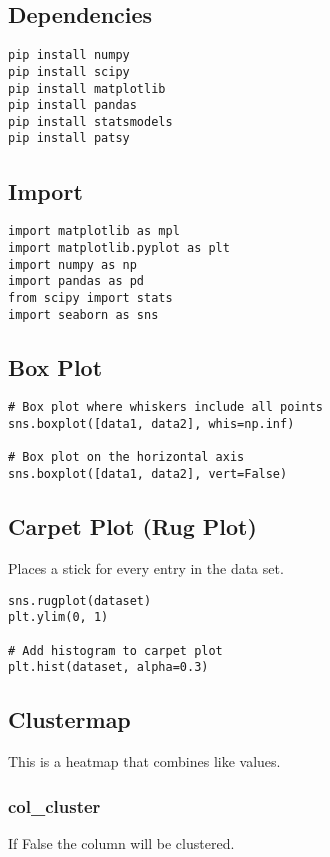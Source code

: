 \subsection{Dependencies}
\begin{lstlisting}
pip install numpy
pip install scipy
pip install matplotlib
pip install pandas
pip install statsmodels
pip install patsy
\end{lstlisting}

\subsection{Import}
\begin{lstlisting}
import matplotlib as mpl
import matplotlib.pyplot as plt
import numpy as np
import pandas as pd
from scipy import stats
import seaborn as sns
\end{lstlisting}

\subsection{Box Plot}

\begin{lstlisting}
# Box plot where whiskers include all points
sns.boxplot([data1, data2], whis=np.inf)

# Box plot on the horizontal axis
sns.boxplot([data1, data2], vert=False)
\end{lstlisting}

\subsection{Carpet Plot (Rug Plot)}
Places a stick for every entry in the data set.

\begin{lstlisting}
sns.rugplot(dataset)
plt.ylim(0, 1)

# Add histogram to carpet plot
plt.hist(dataset, alpha=0.3)
\end{lstlisting}

\subsection{Clustermap}
This is a heatmap that combines like values.

%
\subsubsection{col\_cluster}
If False the column will {\color{red}{not}} be clustered.

